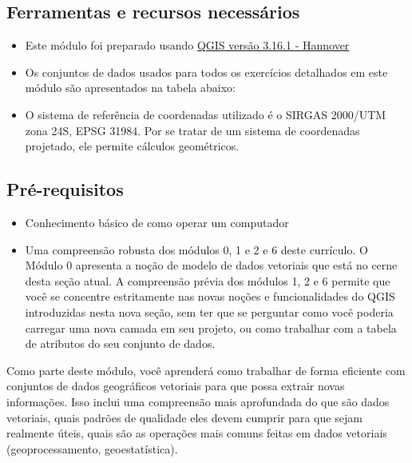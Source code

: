 \documentclass[
  portuguese,
]{krantz}
\providecommand{\tightlist}{%
  \setlength{\itemsep}{0pt}\setlength{\parskip}{0pt}}
\begin{document}
\hypertarget{ferramentas-e-recursos-necessuxe1rios-7}{%
\subsection{Ferramentas e recursos necessários}\label{ferramentas-e-recursos-necessuxe1rios-7}}

\begin{itemize}
\tightlist
\item
  Este módulo foi preparado usando \href{https://qgis.org/en/site/forusers/download.html}{QGIS versão 3.16.1 - Hannover}
\item
  Os conjuntos de dados usados \hspace{0pt}\hspace{0pt}para todos os exercícios detalhados em este módulo são apresentados na tabela abaixo:
\item
  O sistema de referência de coordenadas utilizado é o SIRGAS 2000/UTM zona 24S, EPSG 31984. Por se tratar de um sistema de coordenadas projetado, ele permite cálculos geométricos.
\end{itemize}

\hypertarget{pruxe9-requisitos-8}{%
\subsection{Pré-requisitos}\label{pruxe9-requisitos-8}}

\begin{itemize}
\tightlist
\item
  Conhecimento básico de como operar um computador
\item
  Uma compreensão robusta dos módulos 0, 1 e 2 e 6 deste currículo. O Módulo 0 apresenta a noção de modelo de dados vetoriais que está no cerne desta seção atual. A compreensão prévia dos módulos 1, 2 e 6 permite que você se concentre estritamente nas novas noções e funcionalidades do QGIS introduzidas nesta nova seção, sem ter que se perguntar como você poderia carregar uma nova camada em seu projeto, ou como trabalhar com a tabela de atributos do seu conjunto de dados.
\end{itemize}

Como parte deste módulo, você aprenderá como trabalhar de forma eficiente com conjuntos de dados geográficos vetoriais para que possa extrair novas informações. Isso inclui uma compreensão mais aprofundada do que são dados vetoriais, quais padrões de qualidade eles devem cumprir para que sejam realmente úteis, quais são as operações mais comuns feitas em dados vetoriais (geoprocessamento, geoestatística).
\end{document}
